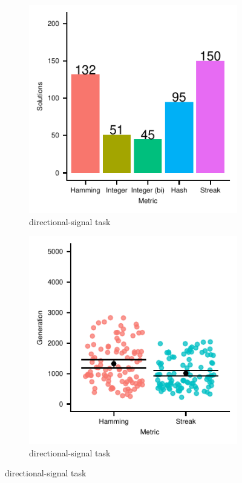 \begin{figure}
\begin{minipage}{0.25\textwidth}
\begin{subfigure}[b]{\linewidth}
\centering
\includegraphics[width=\textwidth]{img/gp_results/panel-dst-sols.pdf}%
\caption{
directional-signal task
}
\label{fig:dst-sols}
\end{subfigure}
\begin{subfigure}[b]{\linewidth}
\centering
\includegraphics[width=\textwidth]{img/gp_results/panel-dst-times.pdf}%
\caption{
directional-signal task
}
\label{fig:dst-times}
\end{subfigure}


\end{minipage}
\end{figure}
